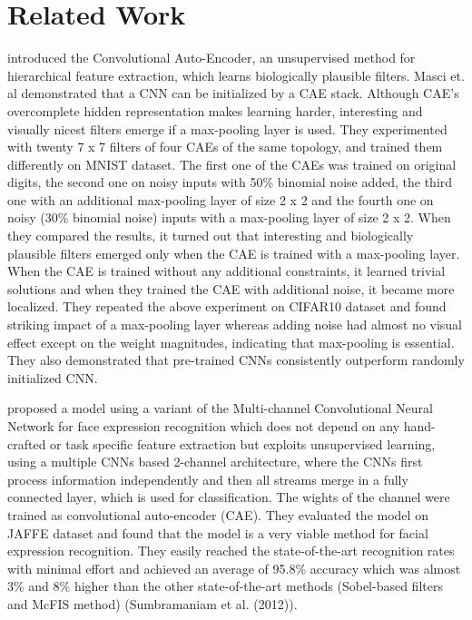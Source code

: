 \documentclass[draft]{article}
\begin{document}
\section{Related Work}
\cite{masci11} introduced the Convolutional Auto-Encoder, an unsupervised method for hierarchical feature extraction, which learns biologically plausible filters. Masci et. al demonstrated that a CNN can be initialized by a CAE stack. Although CAE’s overcomplete hidden representation makes learning harder,  interesting and visually nicest filters emerge if a max-pooling layer is used. They experimented with twenty 7 x 7 filters of four CAEs of the same topology, and trained them differently on MNIST dataset. The first one of the CAEs was trained on original digits, the second one on noisy inputs with 50\% binomial noise added, the third one with an additional max-pooling layer of size 2 x 2 and the fourth one on noisy (30\% binomial noise) inputs with a max-pooling layer of size 2 x 2. When they compared the results, it turned out that interesting and biologically plausible filters emerged only when the CAE is trained with a max-pooling layer. When the CAE is trained without any additional constraints, it learned trivial solutions and when they trained the CAE with additional noise, it became more localized. They repeated the above experiment on CIFAR10 dataset and found striking impact of a max-pooling layer whereas adding noise had almost no visual effect except on the weight magnitudes, indicating that max-pooling is essential. They also demonstrated that pre-trained CNNs consistently outperform randomly initialized CNN.

\cite{hamester15} proposed a model using a variant of the Multi-channel Convolutional Neural Network for face expression recognition which does not depend on any hand-crafted or task specific feature extraction but exploits unsupervised learning, using a multiple CNNs based 2-channel architecture, where the CNNs first process information independently and then all streams merge in a fully connected layer, which is used for classification. The wights of the channel were trained as convolutional auto-encoder (CAE). They evaluated the model on JAFFE dataset and found that the model is a very viable method for facial expression recognition. They easily reached the state-of-the-art recognition rates with minimal effort and achieved an average of 95.8\% accuracy which was almost 3\% and 8\% higher than the other state-of-the-art methods (Sobel-based filters and McFIS method) (Sumbramaniam et al. (2012)).
\end{document}
